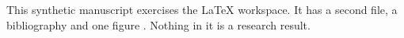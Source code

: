 This synthetic manuscript exercises the LaTeX workspace.
It has a second file, a bibliography and one figure \cite{roe2023}.
Nothing in it is a research result.
